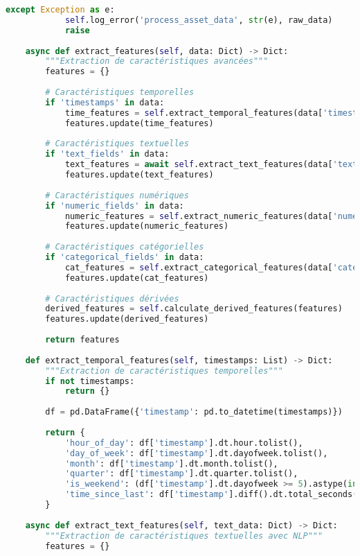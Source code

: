 \documentclass[12pt,a4paper]{report}
\begin{document}
\begin{lstlisting}[language=Python, caption=Pipeline de données IA avec monitoring avancé]
        except Exception as e:
            self.log_error('process_asset_data', str(e), raw_data)
            raise
    
    async def extract_features(self, data: Dict) -> Dict:
        """Extraction de caractéristiques avancées"""
        features = {}
        
        # Caractéristiques temporelles
        if 'timestamps' in data:
            time_features = self.extract_temporal_features(data['timestamps'])
            features.update(time_features)
        
        # Caractéristiques textuelles
        if 'text_fields' in data:
            text_features = await self.extract_text_features(data['text_fields'])
            features.update(text_features)
        
        # Caractéristiques numériques
        if 'numeric_fields' in data:
            numeric_features = self.extract_numeric_features(data['numeric_fields'])
            features.update(numeric_features)
        
        # Caractéristiques catégorielles
        if 'categorical_fields' in data:
            cat_features = self.extract_categorical_features(data['categorical_fields'])
            features.update(cat_features)
        
        # Caractéristiques dérivées
        derived_features = self.calculate_derived_features(features)
        features.update(derived_features)
        
        return features
    
    def extract_temporal_features(self, timestamps: List) -> Dict:
        """Extraction de caractéristiques temporelles"""
        if not timestamps:
            return {}
        
        df = pd.DataFrame({'timestamp': pd.to_datetime(timestamps)})
        
        return {
            'hour_of_day': df['timestamp'].dt.hour.tolist(),
            'day_of_week': df['timestamp'].dt.dayofweek.tolist(),
            'month': df['timestamp'].dt.month.tolist(),
            'quarter': df['timestamp'].dt.quarter.tolist(),
            'is_weekend': (df['timestamp'].dt.dayofweek >= 5).astype(int).tolist(),
            'time_since_last': df['timestamp'].diff().dt.total_seconds().fillna(0).tolist()
        }
    
    async def extract_text_features(self, text_data: Dict) -> Dict:
        """Extraction de caractéristiques textuelles avec NLP"""
        features = {}
        

\end{lstlisting}
\end{document}
